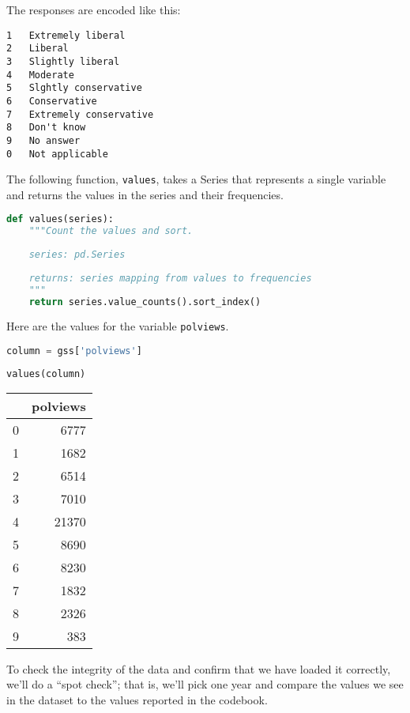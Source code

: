 The responses are encoded like this:

\begin{lstlisting}[]
1   Extremely liberal
2   Liberal
3   Slightly liberal
4   Moderate
5   Slghtly conservative
6   Conservative
7   Extremely conservative
8   Don't know
9   No answer
0   Not applicable
\end{lstlisting}

The following function, \passthrough{\lstinline!values!}, takes a Series
that represents a single variable and returns the values in the series
and their frequencies.

\begin{lstlisting}[language=Python]
def values(series):
    """Count the values and sort.
    
    series: pd.Series
    
    returns: series mapping from values to frequencies
    """
    return series.value_counts().sort_index()
\end{lstlisting}

Here are the values for the variable \passthrough{\lstinline!polviews!}.

\begin{lstlisting}[language=Python]
column = gss['polviews']
\end{lstlisting}

\begin{lstlisting}[language=Python]
values(column)
\end{lstlisting}

\begin{tabular}{lr}
\toprule
{} &  polviews \\
\midrule
0 &      6777 \\
1 &      1682 \\
2 &      6514 \\
3 &      7010 \\
4 &     21370 \\
5 &      8690 \\
6 &      8230 \\
7 &      1832 \\
8 &      2326 \\
9 &       383 \\
\bottomrule
\end{tabular}

To check the integrity of the data and confirm that we have loaded it
correctly, we'll do a ``spot check''; that is, we'll pick one year and
compare the values we see in the dataset to the values reported in the
codebook.

